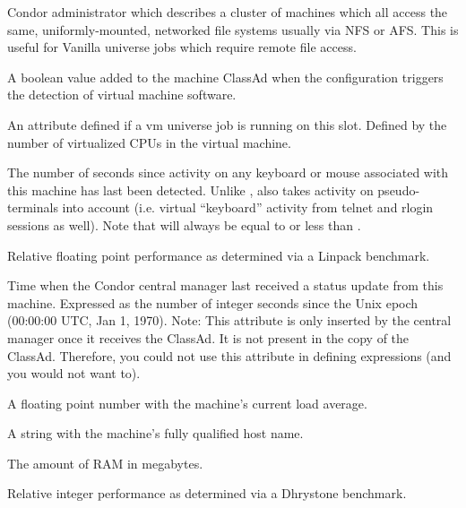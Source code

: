 \begin{description}
Condor administrator which describes a cluster of machines which all
access the same, uniformly-mounted, networked file systems usually via
NFS or AFS.  This is useful for Vanilla universe jobs which require
remote file access.
%
\item[\AdAttr{HasVM}:] A boolean value added to the machine ClassAd
when the configuration triggers the detection of virtual machine
software.
%
\item[\AdAttr{JobVM\_VCPUS}:] An attribute defined if a vm universe job
is running on this slot.  Defined by the number of virtualized CPUs
in the virtual machine.
%
\item[\AdAttr{KeyboardIdle}:] The number of seconds since activity on any
keyboard or mouse associated with this machine has last been detected.
Unlike ,  also takes activity 
on pseudo-terminals into
account (i.e. virtual ``keyboard'' activity from telnet and rlogin
sessions as well).  Note that  will always be equal to or
less than .
%
\item[\AdAttr{KFlops}:] Relative floating point performance as determined via a
Linpack benchmark.
%
\item[\AdAttr{LastHeardFrom}:] Time when the Condor central manager last
received a status update from this machine.  
Expressed as 
the number of integer seconds since the Unix epoch (00:00:00 UTC, Jan 1, 1970).
Note: This attribute is only inserted by the central manager once it
receives the ClassAd.
It is not present in the  copy of the ClassAd.
Therefore, you could not use this attribute in defining 
expressions (and you would not want to).
%
\item[\AdAttr{LoadAvg}:] A floating point number with the machine's current load
average.
%
\item[\AdAttr{Machine}:] A string with the machine's fully qualified host name.
%
\item[\AdAttr{Memory}:] The amount of RAM in megabytes.
%
\item[\AdAttr{Mips}:] Relative integer performance as determined via a Dhrystone
benchmark.


\end{description}
